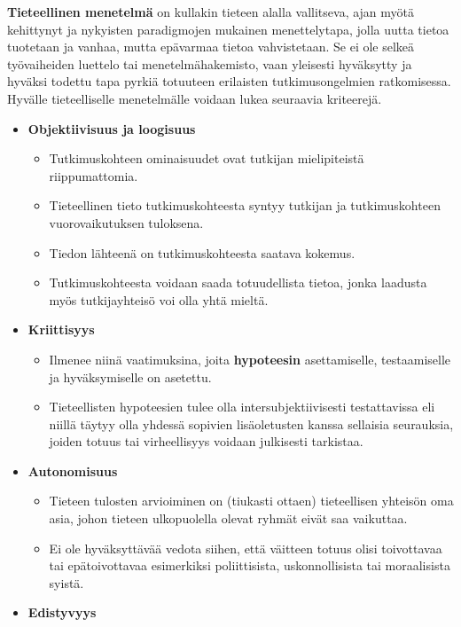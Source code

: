 \documentclass[
]{book}
\providecommand{\tightlist}{%
  \setlength{\itemsep}{0pt}\setlength{\parskip}{0pt}}
\begin{document}
\begin{defblock}{}

\textbf{Tieteellinen menetelmä} on kullakin tieteen alalla vallitseva, ajan myötä kehittynyt ja nykyisten paradigmojen mukainen menettelytapa, jolla uutta tietoa tuotetaan ja vanhaa, mutta epävarmaa tietoa vahvistetaan. Se ei ole selkeä työvaiheiden luettelo tai menetelmähakemisto, vaan yleisesti hyväksytty ja hyväksi todettu tapa pyrkiä totuuteen erilaisten tutkimusongelmien ratkomisessa. Hyvälle tieteelliselle menetelmälle voidaan lukea seuraavia kriteerejä.

\begin{itemize}
\tightlist
\item
  \textbf{Objektiivisuus ja loogisuus}

  \begin{itemize}
  \tightlist
  \item
    Tutkimuskohteen ominaisuudet ovat tutkijan mielipiteistä riippumattomia.
  \item
    Tieteellinen tieto tutkimuskohteesta syntyy tutkijan ja tutkimuskohteen vuorovaikutuksen tuloksena.
  \item
    Tiedon lähteenä on tutkimuskohteesta saatava kokemus.
  \item
    Tutkimuskohteesta voidaan saada totuudellista tietoa, jonka laadusta myös tutkijayhteisö voi olla yhtä mieltä.
  \end{itemize}
\item
  \textbf{Kriittisyys}

  \begin{itemize}
  \tightlist
  \item
    Ilmenee niinä vaatimuksina, joita \textbf{hypoteesin} asettamiselle, testaamiselle ja hyväksymiselle on asetettu.
  \item
    Tieteellisten hypoteesien tulee olla intersubjektiivisesti testattavissa eli niillä täytyy olla yhdessä sopivien lisäoletusten kanssa sellaisia seurauksia, joiden totuus tai virheellisyys voidaan julkisesti tarkistaa.
  \end{itemize}
\item
  \textbf{Autonomisuus}

  \begin{itemize}
  \tightlist
  \item
    Tieteen tulosten arvioiminen on (tiukasti ottaen) tieteellisen yhteisön oma asia, johon tieteen ulkopuolella olevat ryhmät eivät saa vaikuttaa.
  \item
    Ei ole hyväksyttävää vedota siihen, että väitteen totuus olisi toivottavaa tai epätoivottavaa esimerkiksi poliittisista, uskonnollisista tai moraalisista syistä.
  \end{itemize}
\item
  \textbf{Edistyvyys}


\end{itemize}
\end{defblock}
\end{document}
